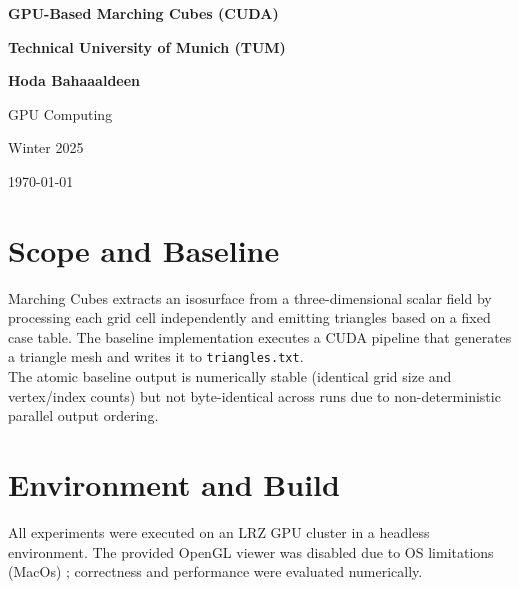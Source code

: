 \documentclass[11pt,a4paper]{article}
\begin{document}
\begin{titlepage}
    \centering
    \vspace*{\fill}

    {\LARGE \textbf{GPU-Based Marching Cubes (CUDA)}\par}
    \vspace{1.5cm}

    {\large
        \textbf{Technical University of Munich (TUM) }

    \textbf{Hoda Bahaaaldeen}\par 
    \vspace{0.5cm}
    GPU Computing\par
    Winter 2025\par
    \vspace{0.5cm}
    }

    \vspace{1.5cm}
    {\large \today\par}

    \vspace*{\fill}
\end{titlepage}

\clearpage
\tableofcontents
\clearpage

\listoftables
\clearpage


\section{Scope and Baseline}

Marching Cubes extracts an isosurface from a three-dimensional scalar field by processing each grid cell independently and emitting triangles based on a fixed case table. The baseline implementation executes a CUDA pipeline that generates a triangle mesh and writes it to \texttt{triangles.txt}. \\

The atomic baseline output is numerically stable (identical grid size and vertex/index counts) but not byte-identical across runs due to non-deterministic parallel output ordering.


\section{Environment and Build}

All experiments were executed on an LRZ GPU cluster in a headless environment. The provided OpenGL viewer was disabled due to OS limitations (MacOs) ; correctness and performance were evaluated numerically.
\end{document}
